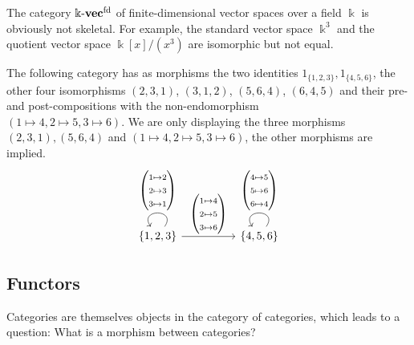 \begin{example}
The category $\Bbbk\textnormal{-}\mathbf{vec}^{\text{fd}}$ of finite-dimensional vector spaces over a field $\Bbbk$ is obviously not
skeletal.
For example, the standard vector space $\Bbbk^{3}$ and the quotient vector space $\Bbbk[x] / (x^{3})$ are isomorphic but not equal.
\end{example}

\begin{example}
The following category has as morphisms the two identities $1_{\{1,2,3\}}, 1_{\{4,5,6\}}$, the other four isomorphisms
$(2, 3, 1)$, $(3, 1, 2)$, $(5, 6, 4)$, $(6, 4, 5)$ and their pre- and post-compositions with the non-endomorphism\\
$(1\mapsto 4, 2\mapsto 5, 3\mapsto 6)$.
We are only displaying the three morphisms $(2, 3, 1), (5, 6, 4)$ and $(1\mapsto 4, 2\mapsto 5, 3\mapsto 6)$, the other morphisms are implied.
\[
\begin{tikzcd}
{\{1,2,3\}} \arrow["\begin{pmatrix} 1\mapsto 2 \\ 2\mapsto 3\\ 3\mapsto 1\end{pmatrix}"', loop, distance=2em, in=125, out=55] \arrow[rr, "\begin{pmatrix} 1\mapsto 4 \\ 2\mapsto 5\\ 3\mapsto 6\end{pmatrix}"] &  & {\{4,5,6\}} \arrow["\begin{pmatrix} 4\mapsto 5 \\ 5\mapsto 6\\ 6\mapsto 4\end{pmatrix}"', loop, distance=2em, in=125, out=55]
\end{tikzcd}
\]
\end{example}

\subsection{Functors}

Categories are themselves objects in the category of categories, which leads to a question: What is a morphism between categories?

